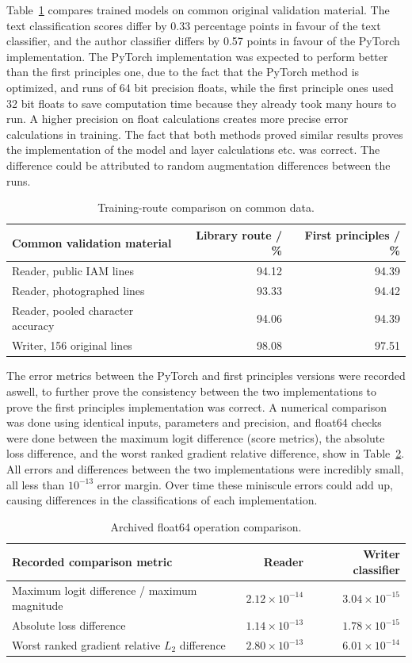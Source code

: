 Table~\ref{tab:dis-training} compares trained models on common original validation material. The text classification scores differ by 0.33 percentage points in favour of the text classifier, and the author classifier differs by 0.57 points in favour of the PyTorch implementation. The PyTorch implementation was expected to perform better than the first principles one, due to the fact that the PyTorch method is optimized, and runs of 64 bit precision floats, while the first principle ones used 32 bit floats to save computation time because they already took many hours to run. A higher precision on float calculations creates more precise error calculations in training. The fact that both methods proved similar results proves the implementation of the model and layer calculations etc. was correct. The difference could be attributed to random augmentation differences between the runs.
\begin{table}[!htbp]\centering\small
\begin{tabularx}{\linewidth}{Xrr}\toprule
\textbf{Common validation material}&\textbf{Library route / \%}&\textbf{First principles / \%}\\\midrule
Reader, public IAM lines&94.12&94.39\\
Reader, photographed lines&93.33&94.42\\
Reader, pooled character accuracy&94.06&94.39\\
Writer, 156 original lines&98.08&97.51\\\bottomrule
\end{tabularx}
\caption{Training-route comparison on common data.}
\label{tab:dis-training}
\end{table}

The error metrics between the PyTorch and first principles versions were recorded aswell, to further prove the consistency between the two implementations to prove the first principles implementation was correct. A numerical comparison was done using identical inputs, parameters and precision, and float64 checks were done between the maximum logit difference (score metrics), the absolute loss difference, and the worst ranked gradient relative difference, show in Table~\ref{tab:des-numericalcheck}. All errors and differences between the two implementations were incredibly small, all less than $10^{-13}$ error margin. Over time these miniscule errors could add up, causing differences in the classifications of each implementation.
\begin{table}[H]\centering\small
\begin{tabularx}{\linewidth}{|X|r|r|}
\hline\textbf{Recorded comparison metric}&\textbf{Reader}&\textbf{Writer classifier}\\\hline
Maximum logit difference / maximum magnitude&$2.12\times10^{-14}$&$3.04\times10^{-15}$\\\hline
Absolute loss difference&$1.14\times10^{-13}$&$1.78\times10^{-15}$\\\hline
Worst ranked gradient relative $L_2$ difference&$2.80\times10^{-13}$&$6.01\times10^{-14}$\\\hline
\end{tabularx}
\caption{Archived float64 operation comparison.}
\label{tab:des-numericalcheck}
\end{table}
